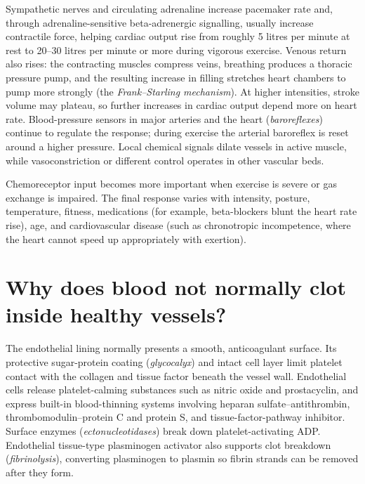 \documentclass[11pt,oneside]{report}
\begin{document}
Sympathetic nerves and circulating adrenaline increase pacemaker rate and,
through adrenaline-sensitive beta-adrenergic signalling, usually increase
contractile force, helping cardiac output rise from roughly 5 litres per minute
at rest to 20--30 litres per minute or more during vigorous exercise. Venous
return also rises: the contracting muscles compress veins, breathing produces
a thoracic pressure pump, and the resulting increase in filling stretches heart
chambers to pump more strongly (the \emph{Frank--Starling mechanism}). At higher
intensities, stroke volume may plateau, so further increases in cardiac output
depend more on heart rate. Blood-pressure sensors in major arteries and the
heart (\emph{baroreflexes}) continue to regulate the response; during exercise
the arterial baroreflex is reset around a higher pressure. Local chemical
signals dilate vessels in active muscle, while vasoconstriction or different
control operates in other vascular beds.

Chemoreceptor input becomes more important when exercise is severe or gas
exchange is impaired. The final response varies with intensity, posture,
temperature, fitness, medications (for example, beta-blockers blunt the heart
rate rise), age, and cardiovascular disease (such as chronotropic incompetence,
where the heart cannot speed up appropriately with exertion).

\section{Why does blood not normally clot inside healthy vessels?}

The endothelial lining normally presents a smooth, anticoagulant surface. Its protective sugar-protein coating (\emph{glycocalyx}) and intact cell layer
limit platelet contact with the collagen and tissue factor beneath the vessel
wall. Endothelial cells release platelet-calming substances such as nitric oxide
and prostacyclin, and express built-in blood-thinning systems involving heparan
sulfate--antithrombin, thrombomodulin--protein C and protein S, and
tissue-factor-pathway inhibitor. Surface enzymes (\emph{ectonucleotidases})
break down platelet-activating ADP. Endothelial tissue-type plasminogen
activator also supports clot breakdown (\emph{fibrinolysis}), converting
plasminogen to plasmin so fibrin strands can be removed after they form.
\end{document}
